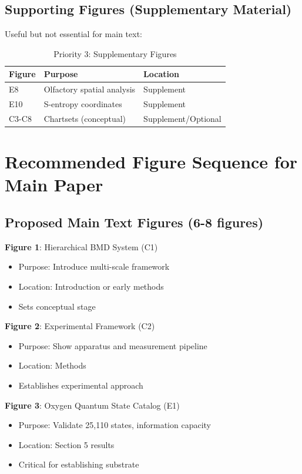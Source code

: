 \documentclass[11pt]{article}
\begin{document}
\subsection{Supporting Figures (Supplementary Material)}

Useful but not essential for main text:

\begin{table}[H]
\centering
\caption{Priority 3: Supplementary Figures}
\begin{tabular}{lp{8cm}l}
\toprule
\textbf{Figure} & \textbf{Purpose} & \textbf{Location} \\
\midrule
E8 & Olfactory spatial analysis & Supplement \\
E10 & S-entropy coordinates & Supplement \\
C3-C8 & Chartsets (conceptual) & Supplement/Optional \\
\bottomrule
\end{tabular}
\end{table}

\newpage

\section{Recommended Figure Sequence for Main Paper}

\subsection{Proposed Main Text Figures (6-8 figures)}

\textbf{Figure 1}: Hierarchical BMD System (C1)
\begin{itemize}
\item Purpose: Introduce multi-scale framework
\item Location: Introduction or early methods
\item Sets conceptual stage
\end{itemize}

\textbf{Figure 2}: Experimental Framework (C2)
\begin{itemize}
\item Purpose: Show apparatus and measurement pipeline
\item Location: Methods
\item Establishes experimental approach
\end{itemize}

\textbf{Figure 3}: Oxygen Quantum State Catalog (E1)
\begin{itemize}
\item Purpose: Validate 25,110 states, information capacity
\item Location: Section 5 results
\item Critical for establishing  substrate
\end{itemize}
\end{document}
